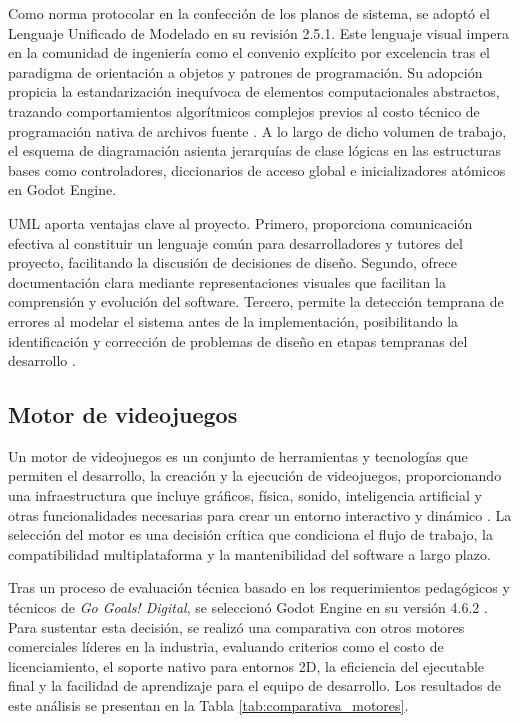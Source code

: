 Como norma protocolar en la confección de los planos de sistema, se adoptó el Lenguaje Unificado de Modelado en su revisión 2.5.1. Este lenguaje visual impera en la comunidad de ingeniería como el convenio explícito por excelencia tras el paradigma de orientación a objetos y patrones de programación. Su adopción propicia la estandarización inequívoca de elementos computacionales abstractos, trazando comportamientos algorítmicos complejos previos al costo técnico de programación nativa de archivos fuente \parencite{Fowler2003}. A lo largo de dicho volumen de trabajo, el esquema de diagramación asienta jerarquías de clase lógicas en las estructuras bases como controladores, diccionarios de acceso global e inicializadores atómicos en Godot Engine.

UML aporta ventajas clave al proyecto. Primero, proporciona comunicación efectiva al constituir un lenguaje común para desarrolladores y tutores del proyecto, facilitando la discusión de decisiones de diseño. Segundo, ofrece documentación clara mediante representaciones visuales que facilitan la comprensión y evolución del software. Tercero, permite la detección temprana de errores al modelar el sistema antes de la implementación, posibilitando la identificación y corrección de problemas de diseño en etapas tempranas del desarrollo \parencite{Fowler2003}.

\subsection{Motor de videojuegos}
\label{subsec:godot}

Un motor de videojuegos es un conjunto de herramientas y tecnologías que permiten el desarrollo, la creación y la ejecución de videojuegos, proporcionando una infraestructura que incluye gráficos, física, sonido, inteligencia artificial y otras funcionalidades necesarias para crear un entorno interactivo y dinámico \parencite{Gregory2018}. La selección del motor es una decisión crítica que condiciona el flujo de trabajo, la compatibilidad multiplataforma y la mantenibilidad del software a largo plazo.

Tras un proceso de evaluación técnica basado en los requerimientos pedagógicos y técnicos de \textit{Go Goals! Digital}, se seleccionó Godot Engine en su versión 4.6.2 \parencite{GodotEngine2026}. Para sustentar esta decisión, se realizó una comparativa con otros motores comerciales líderes en la industria, evaluando criterios como el costo de licenciamiento, el soporte nativo para entornos 2D, la eficiencia del ejecutable final y la facilidad de aprendizaje para el equipo de desarrollo. Los resultados de este análisis se presentan en la Tabla \ref{tab:comparativa_motores}.

